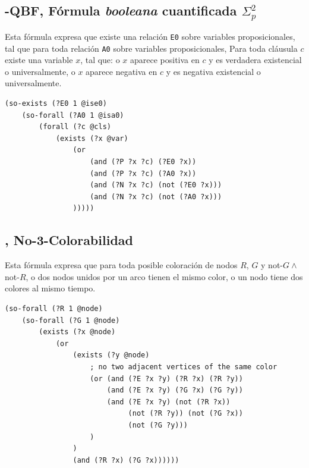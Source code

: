 \subsection{\qEA-QBF, Fórmula \textit{booleana} cuantificada $\Sigma_p^2$}
Esta fórmula expresa que existe una relación \texttt{E0} sobre variables
proposicionales, tal que para toda relación \texttt{A0} sobre variables
proposicionales, Para toda cláusula $c$ existe una variable $x$, tal que: o $x$ aparece
positiva en $c$ y es verdadera existencial o universalmente, o $x$ aparece negativa en $c$ y
es negativa existencial o universalmente.
\begin{verbatim}
(so-exists (?E0 1 @ise0)
    (so-forall (?A0 1 @isa0)
        (forall (?c @cls)
            (exists (?x @var)
                (or
                    (and (?P ?x ?c) (?E0 ?x))
                    (and (?P ?x ?c) (?A0 ?x))
                    (and (?N ?x ?c) (not (?E0 ?x)))
                    (and (?N ?x ?c) (not (?A0 ?x)))
                )))))
\end{verbatim}

\subsection{\coCOL, No-3-Colorabilidad}
Esta fórmula expresa que para toda posible coloración de nodos $R$, $G$ y not-$G \land $ not-$R$, o dos nodos unidos por un arco tienen
el mismo color, o un nodo tiene dos colores al mismo tiempo.
\begin{verbatim}
(so-forall (?R 1 @node)
    (so-forall (?G 1 @node)
        (exists (?x @node)
            (or 
                (exists (?y @node)
                    ; no two adjacent vertices of the same color
                    (or (and (?E ?x ?y) (?R ?x) (?R ?y))
                        (and (?E ?x ?y) (?G ?x) (?G ?y))
                        (and (?E ?x ?y) (not (?R ?x)) 
                             (not (?R ?y)) (not (?G ?x)) 
                             (not (?G ?y)))
                    )
                )
                (and (?R ?x) (?G ?x))))))
\end{verbatim}

